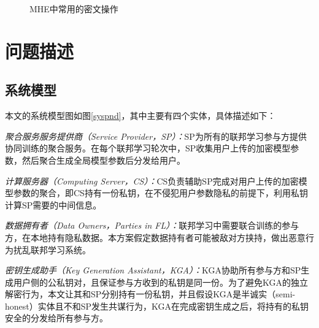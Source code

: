 \begin{figure}[!htb]
	\caption{MHE中常用的密文操作}
	\label{f1}
\end{figure}


\section{问题描述}\label{ps}

\subsection{系统模型}
本文的系统模型图如图\ref{syspnd}，其中主要有四个实体，具体描述如下：
\begin{compactitem}
	\item \textit{聚合服务服务提供商（Service Provider，SP）：}SP为所有的联邦学习参与方提供协同训练的聚合服务。在每个联邦学习轮次中，SP收集用户上传的加密模型参数，然后聚合生成全局模型参数后分发给用户。
	\item \textit{计算服务器（Computing Server，CS）：}CS负责辅助SP完成对用户上传的加密模型参数的聚合，即CS持有一份私钥，在不侵犯用户参数隐私的前提下，利用私钥计算SP需要的中间信息。
	\item \textit{数据拥有者（Data Owners，Parties in FL）：}联邦学习中需要联合训练的参与方，在本地持有隐私数据。本方案假定数据持有者可能被敌对方挟持，做出恶意行为扰乱联邦学习系统。
	\item \textit{密钥生成助手（Key Generation Assistant，KGA）：}KGA协助所有参与方和SP生成用户侧的公私钥对，且保证参与方收到的私钥是同一份。为了避免KGA的独立解密行为，本文让其和SP分别持有一份私钥，并且假设KGA是半诚实（semi-honest）实体且不和SP发生共谋行为，KGA在完成密钥生成之后，将持有的私钥安全的分发给所有参与方。
\end{compactitem}

